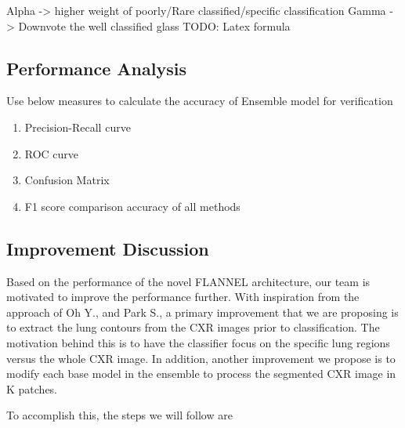 \documentclass{sigkddExp}
\begin{document}
Alpha -> higher weight of poorly/Rare classified/specific classification
Gamma -> Downvote the well classified glass
TODO: Latex formula

\subsection{Performance Analysis}
Use below measures to calculate the accuracy of Ensemble model for verification

\begin{enumerate}
    \item Precision-Recall curve
    \item ROC curve
    \item Confusion Matrix
    \item F1 score comparison accuracy of all methods 
\end{enumerate}



\subsection{Improvement Discussion}

Based on the performance of the novel FLANNEL architecture, our team is
motivated to improve the performance further. With inspiration from the approach
of Oh Y., and Park S., a primary improvement that we are proposing is to extract
the lung contours from the CXR images prior to classification. The motivation
behind this is to have the classifier focus on the specific lung regions versus
the whole CXR image. In addition, another improvement we propose is to modify
each base model in the ensemble to process the segmented CXR image in K patches.

To accomplish this, the steps we will follow are
\end{document}
